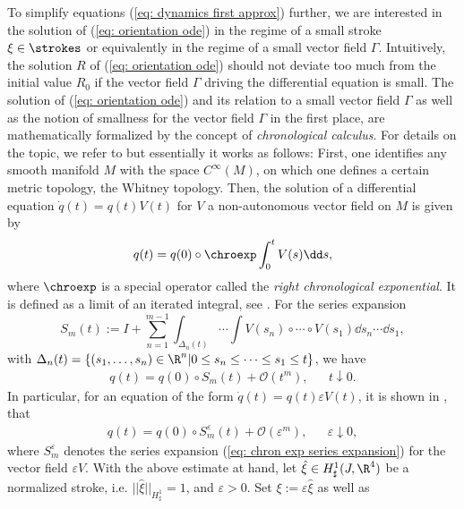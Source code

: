 To simplify equations  (\ref{eq: dynamics first approx}) further, we are interested in the solution of (\ref{eq: orientation ode}) in the regime of a small stroke $\xi \in \strokes$ or equivalently in the regime of a small vector field $\Gamma$. Intuitively, the solution $R$ of (\ref{eq: orientation ode}) should not deviate too much from the initial value $R_0$ if the vector field $\Gamma$ driving the differential equation is small. The solution of (\ref{eq: orientation ode}) and its relation to a small vector field $\Gamma$ as well as the notion of smallness for the vector field $\Gamma$ in the first place, are mathematically formalized by the concept of \emph{chronological calculus}. For details on the topic, we refer to \cite{Agrachev2004} but essentially it works as follows: First, one identifies any smooth manifold $M$ with the space $C^{\infty}(M)$, on which one defines a certain metric topology, the Whitney topology. Then, the solution of a differential equation $\dot{q}(t) = q(t) V(t)$ for $V$ a non-autonomous vector field on $M$ is given by
\begin{equation}
	q(t) = q(0)\circ\chroexp \int_{0}^{t} V(s) \dd s,
\end{equation}
where $\chroexp$ is a special operator called the \emph{right chronological exponential}. It is defined as a limit of an iterated integral, see \cite{Agrachev2004}. For the series expansion
\begin{equation}
\label{eq: chron exp series expansion}
S_m(t) := I + \sum_{n = 1}^{m-1} \int_{\Delta_n(t)} \dotsm \int V(s_n) \circ \dotsm \circ V(s_1) \dd s_n \dotsm \dd s_1,
\end{equation}
with $\Delta_n(t) = \{(s_1, \dotsc, s_n) \in \R^n | 0 \leq s_n \leq \dotsm \leq s_1 \leq t\}$, we have
\begin{align}
q(t) = q(0) \circ S_m(t) + \mathcal{O}(t^m), & & t \downarrow 0.
\end{align}
In particular, for an equation of the form $\dot{q}(t) = q(t) \varepsilon V(t)$, it is shown in \cite{Agrachev2004}, that
\begin{align}
\label{eq: estimation of chronological exponential}
	q(t) = q(0) \circ S_m^{\varepsilon}(t) + \mathcal{O}(\varepsilon^m), & & \varepsilon \downarrow 0,
\end{align}
where $S_{m}^{\varepsilon}$ denotes the series expansion (\ref{eq: chron exp series expansion}) for the vector field $\varepsilon V$.
With the above estimate at hand, let $\hat{\xi} \in H^1_{\sharp}(J, \R^4)$ be a normalized stroke, i.e. $||\hat{\xi}||_{H_{\sharp}^1} = 1$, and $\varepsilon > 0$. Set $\xi := \varepsilon \hat{\xi}$ as well as 
